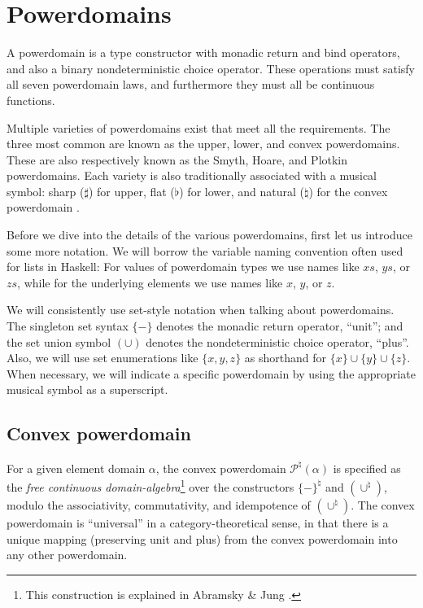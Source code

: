 \section{Powerdomains}
\label{sec:Powerdomains}

A powerdomain is a type constructor with monadic return and bind operators, and also a binary nondeterministic choice operator. These operations must satisfy all seven powerdomain laws, and furthermore they must all be continuous functions.

Multiple varieties of powerdomains exist that meet all the requirements. The three most common are known as the upper, lower, and convex powerdomains. These are also respectively known as the Smyth, Hoare, and Plotkin powerdomains. Each variety is also traditionally associated with a musical symbol: sharp ($\sharp$) for upper, flat ($\flat$) for lower, and natural ($\natural$) for the convex powerdomain \cite{gunter90semantic}.

Before we dive into the details of the various powerdomains, first let us introduce some more notation. We will borrow the variable naming convention often used for lists in Haskell: For values of powerdomain types we use names like $xs$, $ys$, or $zs$, while for the underlying elements we use names like $x$, $y$, or $z$.

We will consistently use set-style notation when talking about powerdomains. The singleton set syntax $\{-\}$ denotes the monadic return operator, ``unit''; and the set union symbol $(\cup)$ denotes the nondeterministic choice operator, ``plus''. Also, we will use set enumerations like $\{x,y,z\}$ as shorthand for $\{x\}\cup\{y\}\cup\{z\}$. When necessary, we will indicate a specific powerdomain by using the appropriate musical symbol as a superscript.


\subsection{Convex powerdomain}

For a given element domain $\alpha$, the convex powerdomain $\mathcal{P}^{\natural}(\alpha)$ is specified as the \emph{free continuous domain-algebra}\footnote{This construction is explained in Abramsky \& Jung \cite[\S6.1]{abramsky94domain}.} over the constructors $\{-\}^{\natural}$ and $(\cup^{\natural})$, modulo the associativity, commutativity, and idempotence of $(\cup^{\natural})$. The convex powerdomain is ``universal'' in a category-theoretical sense, in that there is a unique mapping (preserving unit and plus) from the convex powerdomain into any other powerdomain.


